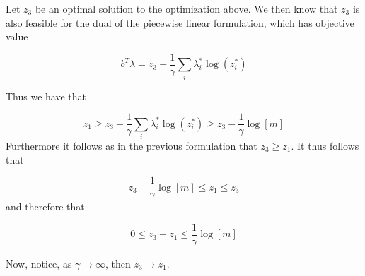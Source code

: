 \documentclass{article} %
\begin{document}
\begin{itemize}
Let $z_3$ be an optimal solution to the optimization above. We then know that $z_3$ is also feasible for the dual of the piecewise
linear formulation, which has objective value 

\[
b^T \lambda = z_3 +   \frac{1}{\gamma} \sum_{i} \lambda_i^{*} \log(z_i^*)
\]

Thus we have that

\[
z_1 \geq  z_3 +   \frac{1}{\gamma} \sum_{i}\lambda_i^{*} \log(z_i^*) \geq z_3 -  \frac{1}{\gamma} \log[m]
\]
Furthermore it follows as in the previous formulation that $z_3 \geq z_1$.
It thus follows that 

\[
z_3 - \frac{1}{\gamma} \log[m] \leq z_1 \leq z_3 
\]
and therefore that

\[
0 \leq z_3 - z_1 \leq \frac{1}{\gamma} \log[m]
\]


Now, notice, as  $\gamma \to \infty$, then $z_3 \to z_1$. 


\end{itemize}
\end{document}
